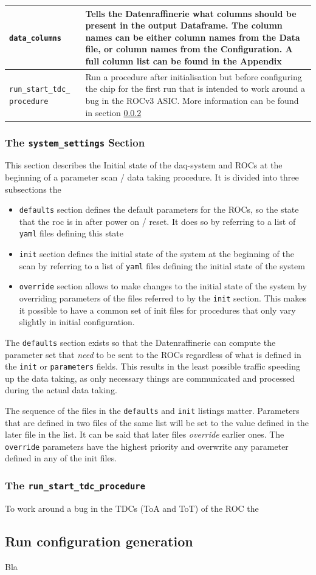 \documentclass[11pt]{article}
\begin{document}
\begin{center}
\begin{tabular}{| m{4cm} | m{8.5cm} |}
\verb|data_columns| & Tells the Datenraffinerie what columns should be present in the output Dataframe. The column names can be either column names from the Data file, or column names from the Configuration. A full column list can be found in the Appendix \\ \hline %
\verb|run_start_tdc_| \verb|procedure| & Run a procedure after initialisation but before configuring the chip for the first run that is intended to work around a bug in the ROCv3 ASIC. More information can be found in section \ref{sec:start_tdc_proc}\\ \hline
\end{tabular}
\end{center}

\subsubsection{The \texttt{system\_settings} Section}\label{sec:system_settings}
This section describes the Initial state of the daq-system and ROCs at the beginning of a parameter scan / data taking procedure. It is divided into three subsections the
\begin{itemize}
	\item \verb|defaults| section defines the default parameters for the ROCs, so the state that the roc is in after power on / reset. It does so by referring to a list of \texttt{yaml} files defining this state
	\item \verb|init| section defines the initial state of the system at the beginning of the scan by referring to a list of \texttt{yaml} files defining the initial state of the system
	\item \verb|override| section allows to make changes to the initial state of the system by overriding parameters of the files referred to by the \verb|init| section. This makes it possible to have a common set of init files for procedures that only vary slightly in initial configuration. 
\end{itemize}
The \texttt{defaults} section exists so that the Datenraffinerie can compute the parameter set that \emph{need} to be sent to the ROCs regardless of what is defined in the \texttt{init} or \texttt{parameters} fields. This results in the least possible traffic speeding up the data taking, as only necessary things are communicated and processed during the actual data taking.
 
The sequence of the files in the \texttt{defaults} and \texttt{init} listings matter. Parameters that are defined in two files of the same list will be set to the value defined in the later file in the list. It can be said that later files \emph{override} earlier ones. The \texttt{override} parameters have the highest priority and overwrite any parameter defined in any of the init files.
\subsubsection{The \texttt{run\_start\_tdc\_procedure}}\label{sec:start_tdc_proc}
To work around a bug in the TDCs (ToA and ToT) of the ROC the 
\subsection{Run configuration generation}\label{sec:run_config}
Bla
\end{document}
